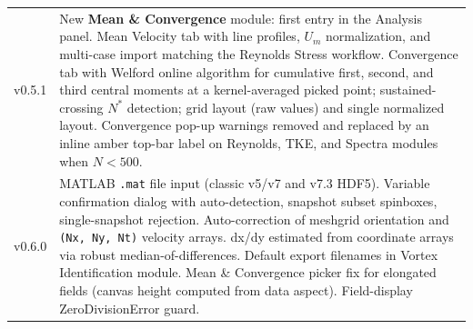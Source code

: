 \documentclass[11pt, a4paper]{report}
\newcommand{\uipth}[1]{\textbf{\textcolor{upblue}{#1}}}
\begin{document}
\begin{longtable}{lp{12cm}}
v0.5.1 & New \uipth{Mean \& Convergence} module: first entry in the Analysis panel. Mean Velocity tab with line profiles, $U_m$ normalization, and multi-case import matching the Reynolds Stress workflow. Convergence tab with Welford online algorithm for cumulative first, second, and third central moments at a kernel-averaged picked point; sustained-crossing $N^*$ detection; grid layout (raw values) and single normalized layout. Convergence pop-up warnings removed and replaced by an inline amber top-bar label on Reynolds, TKE, and Spectra modules when $N < 500$. \\
v0.6.0 & MATLAB \texttt{.mat} file input (classic v5/v7 and v7.3 HDF5). Variable confirmation dialog with auto-detection, snapshot subset spinboxes, single-snapshot rejection. Auto-correction of meshgrid orientation and \texttt{(Nx, Ny, Nt)} velocity arrays. dx/dy estimated from coordinate arrays via robust median-of-differences. Default export filenames in Vortex Identification module. Mean \& Convergence picker fix for elongated fields (canvas height computed from data aspect). Field-display ZeroDivisionError guard. \\
\bottomrule
\end{longtable}
\end{document}

